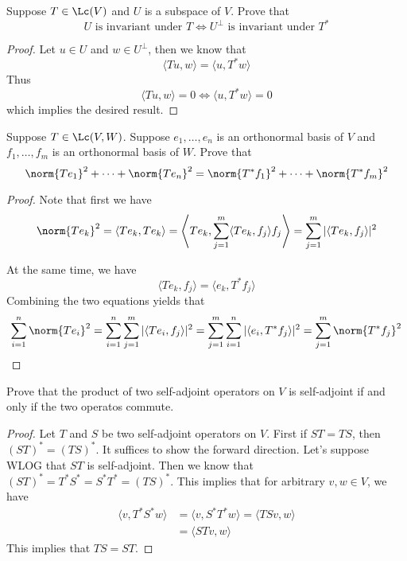 \documentclass{extarticle}
\begin{document}
\begin{problem}{4}
    Suppose \(T \in \Lc(V)\) and \(U\) is a subspace of \(V\). Prove that
    \[U \text{ is invariant under } T \Longleftrightarrow U^\perp \text{ is invariant under }T^*\]
\end{problem}

\begin{proof}
Let \(u \in U\) and \(w \in U^\perp\), then we know that
\[\langle Tu,w \rangle = \langle u,T^*w \rangle\]
Thus
\[\langle Tu,w \rangle = 0 \Longleftrightarrow \langle u,T^*w \rangle = 0\]
which implies the desired result.
\end{proof}

\begin{problem}{5}
    Suppose \(T \in \Lc(V, W)\). Suppose \(e_1, \ldots, e_n\) is an orthonormal basis of \(V\) and
    \(f_1, \ldots, f_m\) is an orthonormal basis of \(W\). Prove that
    \[\norm{T e_1}^2 + \cdots + \norm{T e_n}^2 = \norm{T^* f_1 }^2 + \cdots + \norm{T^* f_m}^2\]
\end{problem}

\begin{proof}
Note that first we have
\[\norm{T e_k}^2 = \langle T e_k, T e_k \rangle
= \left\langle T e_k, \sum_{j=1}^{m} \langle T e_k, f_j \rangle f_j \right\rangle
= \sum_{j=1}^{m} |\langle T e_k, f_j \rangle|^2\]

At the same time, we have
\[ \langle Te_k, f_j \rangle = \langle e_k, T^* f_j \rangle\]
Combining the two equations yields that
\begin{align*}
    \sum_{i=1}^{n} \norm{T e_i}^2
    = \sum_{i=1}^{n} \sum_{j=1}^{m} |\langle T e_i,f_j \rangle|^2
    = \sum_{j=1}^{m} \sum_{i=1}^{n} |\langle e_i,T^* f_j \rangle|^2
    = \sum_{j=1}^{m} \norm{T^* f_j}^2
\end{align*}
\end{proof}

\begin{problem}{9}
    Prove that the product of two self-adjoint operators on \(V\) is self-adjoint if and only if the
    two operatos commute.
\end{problem}

\begin{proof}
Let \(T\) and \(S\) be two self-adjoint operators on \(V\). First if \(ST = TS\), then \((ST)^*
= (TS)^*\). It suffices to show the forward direction. Let's suppose WLOG that \(ST\) is self-adjoint.
Then we know that \((ST)^* = T^* S^* = S^* T^* = (TS)^*\). This implies that for arbitrary
\(v, w \in V\), we have
\begin{align*}
    \langle v,T^* S^* w \rangle
    &= \langle v, S^* T^* w \rangle = \langle TSv,w \rangle \\
    &= \langle STv,w \rangle
\end{align*}
This implies that \(TS = ST\).
\end{proof}
\end{document}

